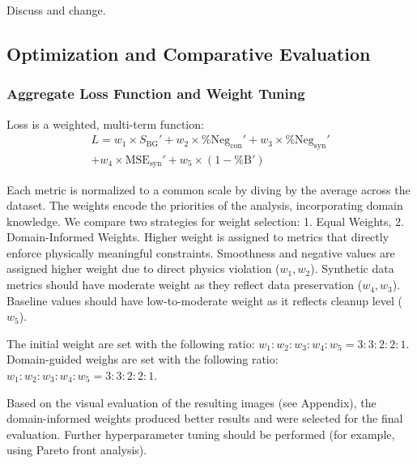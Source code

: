 \documentclass[iucr,review]{iucrjournals}
\begin{document}
\colorbox{SkyBlue!20}{Discuss and change.}





\subsection{Optimization and Comparative Evaluation}
\subsubsection{Aggregate Loss Function and Weight Tuning}
Loss is a weighted, multi-term function:
$$\begin{aligned}
L = w_1 \times S_{\mathrm{BG}}' + w_2 \times \%\mathrm{Neg}_{\mathrm{con}}' + w_3 \times   \%\mathrm{Neg}_{\mathrm{syn}}'\\
+ w_4 \times \mathrm{MSE}_{\mathrm{syn}}' + w_5 \times (1-\%\mathrm{B}')
\end{aligned}$$

Each metric is normalized to a common scale by diving by the average across the dataset. 
The weights encode the priorities of the analysis, incorporating domain knowledge. 
We compare two strategies for weight selection: 1. Equal Weights, 2. Domain-Informed Weights.
Higher weight is assigned to metrics that directly enforce physically meaningful constraints.
Smoothness and negative values are assigned higher weight due to direct physics violation ($w_1, w_2$).
Synthetic data metrics should have moderate weight as they reflect data preservation ($w_4,  w_3$).
Baseline values should have low-to-moderate weight as it reflects cleanup level ($w_5$). 

The initial weight are set with the following ratio: $w_1 : w_2 : w_3 : w_4 : w_5 = 3 : 3 : 2 : 2 : 1 $.\\
Domain-guided weighs are set with the following ratio: $w_1 : w_2 : w_3 : w_4 : w_5 = 3 : 3 : 2 : 2 : 1 $.

Based on the visual evaluation of the resulting images (see Appendix),
the domain-informed weights produced better results and were selected for the final evaluation.
Further hyperparameter tuning should be performed (for example, using Pareto front analysis).
\end{document}
